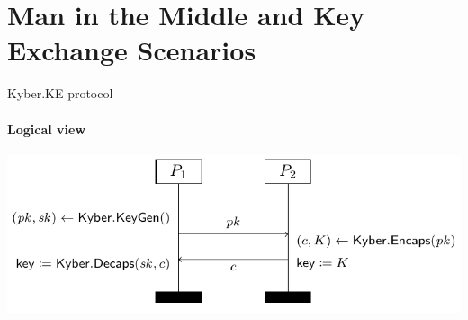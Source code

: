     \section{Man in the Middle and Key Exchange Scenarios}

\begin{frame}{Kyber.KE protocol}
    \framesubtitle{Logical view}

\begin{center}\includegraphics[scale=0.6]{./assets/logical_view.png}\end{center}

\end{frame}

